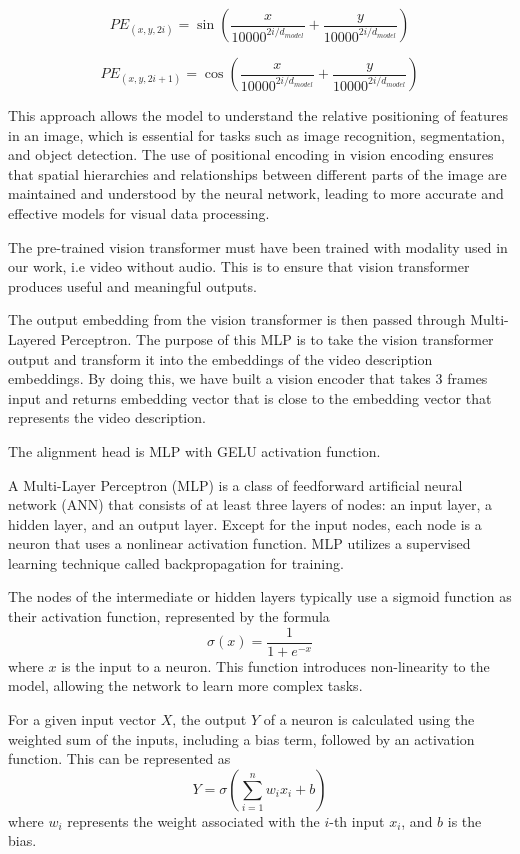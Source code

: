 \begin{spacing}{1.5}
\begin{sloppypar}
$$
PE_{(x,y,2i)} = \sin\left(\frac{x}{10000^{2i/d_{model}}} + \frac{y}{10000^{2i/d_{model}}}\right)
$$

$$
PE_{(x,y,2i+1)} = \cos\left(\frac{x}{10000^{2i/d_{model}}} + \frac{y}{10000^{2i/d_{model}}}\right)
$$

This approach allows the model to understand the relative positioning of features in an image, which is essential for tasks such as image recognition, segmentation, and object detection. The use of positional encoding in vision encoding ensures that spatial hierarchies and relationships between different parts of the image are maintained and understood by the neural network, leading to more accurate and effective models for visual data processing.

The pre-trained vision transformer must have been trained with modality used in our work, i.e video without audio. This is to ensure that vision transformer produces useful and meaningful outputs. 

The output embedding from the vision transformer is then passed through Multi-Layered Perceptron. The purpose of this MLP is to take the vision transformer output and transform it into the embeddings of the video description embeddings. By doing this, we have built a vision encoder that takes 3 frames input and returns embedding vector that is close to the embedding vector that represents the video description. 

The alignment head is MLP with GELU activation function.

A Multi-Layer Perceptron (MLP) is a class of feedforward artificial neural network (ANN) that consists of at least three layers of nodes: an input layer, a hidden layer, and an output layer. Except for the input nodes, each node is a neuron that uses a nonlinear activation function. MLP utilizes a supervised learning technique called backpropagation for training. 

The nodes of the intermediate or hidden layers typically use a sigmoid function as their activation function, represented by the formula $$\sigma(x) = \frac{1}{1 + e^{-x}}$$ where \(x\) is the input to a neuron. This function introduces non-linearity to the model, allowing the network to learn more complex tasks.

For a given input vector \(X\), the output \(Y\) of a neuron is calculated using the weighted sum of the inputs, including a bias term, followed by an activation function. This can be represented as $$Y = \sigma(\sum_{i=1}^{n} w_i x_i + b)$$ where \(w_i\) represents the weight associated with the \(i\)-th input \(x_i\), and \(b\) is the bias.


\end{sloppypar}
\end{spacing}
